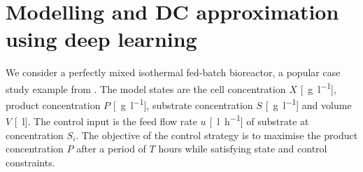 \documentclass[final,5p,times,twocolumn,authoryear]{elsarticle}
\begin{document}
\section{Modelling and DC approximation using deep learning}
\label{sec:modelling}

We consider a perfectly mixed isothermal fed-batch bioreactor, a popular case study example from \citep{srinivasan03}. The model states are
the cell concentration $X$ [\SI{}{\gram\per\litre}],
product concentration $P$ [\SI{}{\gram\per\litre}],
substrate concentration $S$ [\SI{}{\gram\per\litre}] and
volume $V$ [\SI{}{\litre}].
%
The control input is
the feed flow rate $u$ [\SI{}{\litre\per\hour}] of substrate at concentration $S_i$.
%
The objective of the control strategy is to maximise the product concentration $P$ after a period of $T$ hours while satisfying state and control constraints.
%
\end{document}
